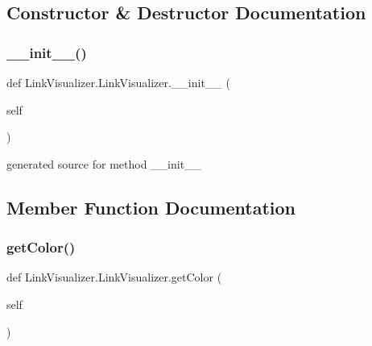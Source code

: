 \subsection{Constructor \& Destructor Documentation}
\hypertarget{class_link_visualizer_1_1_link_visualizer_af672a41789fed6cf222a2f531f726944}{}\label{class_link_visualizer_1_1_link_visualizer_af672a41789fed6cf222a2f531f726944} 
\subsubsection{\texorpdfstring{\+\_\+\+\_\+init\+\_\+\+\_\+()}{\_\_init\_\_()}}
{\footnotesize\ttfamily def Link\+Visualizer.\+Link\+Visualizer.\+\_\+\+\_\+init\+\_\+\+\_\+ (\begin{DoxyParamCaption}\item[{}]{self }\end{DoxyParamCaption})}

\begin{DoxyVerb}generated source for method __init__ \end{DoxyVerb}
 

\subsection{Member Function Documentation}
\hypertarget{class_link_visualizer_1_1_link_visualizer_a562ead1a8644b914377a2c566f3ed8de}{}\label{class_link_visualizer_1_1_link_visualizer_a562ead1a8644b914377a2c566f3ed8de} 
\subsubsection{\texorpdfstring{get\+Color()}{getColor()}}
{\footnotesize\ttfamily def Link\+Visualizer.\+Link\+Visualizer.\+get\+Color (\begin{DoxyParamCaption}\item[{}]{self }\end{DoxyParamCaption})}



